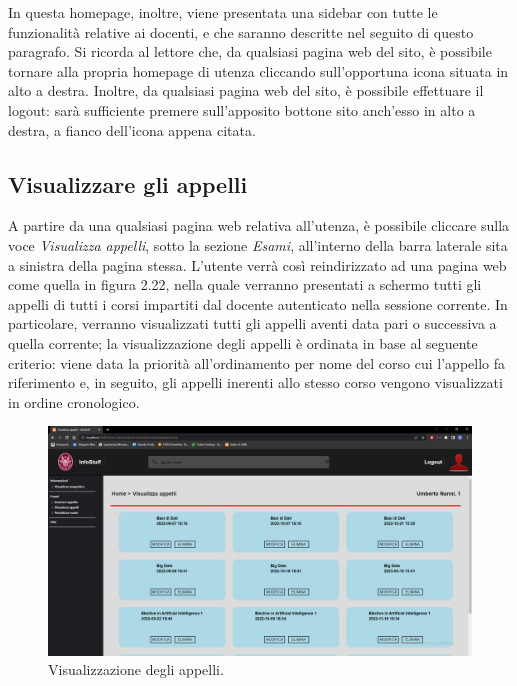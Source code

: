 \documentclass [a4paper,11pt]{book}
\begin{document}
In questa homepage, inoltre, viene presentata una sidebar con tutte le funzionalità relative ai docenti, e che saranno descritte nel seguito di questo paragrafo. Si ricorda al lettore che, da qualsiasi pagina web del sito, è possibile tornare alla propria homepage di utenza cliccando sull'opportuna icona situata in alto a destra. Inoltre, da qualsiasi pagina web del sito, è possibile effettuare il logout: sarà sufficiente premere sull'apposito bottone sito anch'esso in alto a destra, a fianco dell'icona appena citata.

\medskip

\subsection{Visualizzare gli appelli}
\label{sec:visualizzaAppelli}

A partire da una qualsiasi pagina web relativa all'utenza, è possibile cliccare sulla voce \emph{Visualizza appelli}, sotto la sezione \emph{Esami}, all'interno della barra laterale sita a sinistra della pagina stessa. L'utente verrà così reindirizzato ad una pagina web come quella in figura 2.22, nella quale verranno presentati a schermo tutti gli appelli di tutti i corsi impartiti dal docente autenticato nella sessione corrente. In particolare, verranno visualizzati tutti gli appelli aventi data pari o successiva a quella corrente; la visualizzazione degli appelli è ordinata in base al seguente criterio: viene data la priorità all'ordinamento per nome del corso cui l'appello fa riferimento e, in seguito, gli appelli inerenti allo stesso corso vengono visualizzati in ordine cronologico.

\begin{figure}
\centering
\includegraphics[scale=0.3]{figura2-22.png}
\caption{Visualizzazione degli appelli.}
\end{figure}
\end{document}
